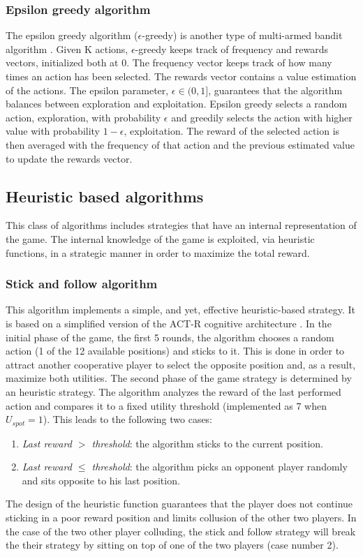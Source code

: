 \documentclass[runningheads]{llncs}
\begin{document}
\subsubsection{Epsilon greedy algorithm}
The epsilon greedy algorithm ($\epsilon$-greedy) is another type of
multi-armed bandit algorithm \cite{egreedy}. Given K actions, $\epsilon$-greedy keeps
track of frequency and rewards vectors, initialized both at 0. The
frequency vector keeps track of how many times an action has been
selected. The rewards vector contains a value estimation of the
actions. The epsilon parameter, $\epsilon \in (0, 1]$, guarantees that
the algorithm balances between exploration and exploitation. Epsilon
greedy selects a random action, exploration, with probability
$\epsilon$ and greedily selects the action with higher value with
probability $1 - \epsilon$, exploitation. The reward of the selected action is then
averaged with the frequency of that action and the previous estimated
value to update the rewards vector.


\subsection{Heuristic based algorithms}
This class of algorithms includes strategies that have an internal
representation of the game. The internal knowledge of the game is
exploited, via heuristic functions, in a strategic manner in order to
maximize the total reward.

\subsubsection{Stick and follow algorithm}
This algorithm implements a simple, and yet, effective heuristic-based
strategy. It is based on a simplified version of the ACT-R cognitive
architecture \cite{act-r}. In the initial phase of the game, the first 5
rounds, the algorithm chooses a random action (1 of the 12 available
positions) and sticks to it. This is done in order to attract another
cooperative player to select the opposite position and, as a result,
maximize both utilities. The second phase of the game strategy is
determined by an heuristic strategy. The algorithm analyzes the reward
of the last performed action and compares it to a fixed utility
threshold (implemented as 7 when $U_{spot} = 1$). This leads to the
following two cases:
\begin{enumerate}
\item \textit{Last reward $>$ threshold}: the algorithm sticks to the
  current position.
\item \textit{Last reward $\leq$ threshold}: the algorithm picks an
  opponent player randomly and sits opposite to his last position.
\end{enumerate}
The design of the heuristic function guarantees that the player does
not continue sticking in a poor reward position and limits collusion
of the other two players. In the case of the two other player
colluding, the stick and follow strategy will break the their strategy
by sitting on top of one of the two players (case number 2). 
\end{document}
